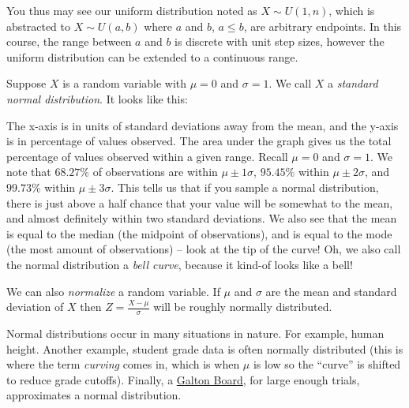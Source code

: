 \documentclass[main.tex]{subfiles}
\begin{document}
\begin{rem}
	You thus may see our uniform distribution noted as \(X \sim U(1,n)\), which is abstracted to \(X \sim U(a,b)\) where \(a\) and \(b\), \(a \leq b\), are arbitrary endpoints. In this course, the range between \(a\) and \(b\) is discrete with unit step sizes, however the uniform distribution can be extended to a continuous range.
\end{rem}

\begin{example}
	Suppose \(X\) is a random variable with \(\mu = 0\) and \(\sigma = 1\). We call \(X\) a \textit{standard normal distribution}. It looks like this:
	\medskip
	\begin{center}
	\end{center}
	
	The x-axis is in units of standard deviations away from the mean, and the y-axis is in percentage of values observed. The area under the graph gives us the total percentage of values observed within a given range. Recall \(\mu=0\) and \(\sigma=1\). We note that \(68.27\%\) of observations are within \(\mu \pm 1\sigma\), \(95.45\%\) within \(\mu \pm 2\sigma\), and \(99.73\%\) within \(\mu \pm 3\sigma\). This tells us that if you sample a normal distribution, there is just above a half chance that your value will be somewhat to the mean, and almost definitely within two standard deviations. We also see that the mean is equal to the median (the midpoint of observations), and is equal to the mode (the most amount of observations) -- look at the tip of the curve! Oh, we also call the normal distribution a \textit{bell curve}, because it kind-of looks like a bell!
	
	We can also \textit{normalize} a random variable. If \(\mu\) and \(\sigma\) are the mean and standard deviation of \(X\) then \(Z = \frac{X - \mu}{\sigma}\) will be roughly normally distributed.
	
	Normal distributions occur in many situations in nature. For example, human height. Another example, student grade data is often normally distributed (this is where the term \textit{curving} comes in, which is when \(\mu\) is low so the ``curve'' is shifted to reduce grade cutoffs). Finally, a \href{https://mathworld.wolfram.com/GaltonBoard.html}{Galton Board}, for large enough trials, approximates a normal distribution.
\end{example}
\end{document}
